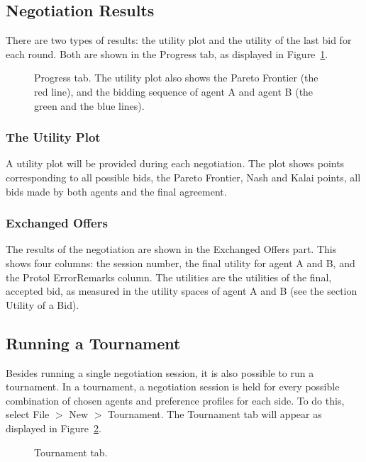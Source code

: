\documentclass[]{article}
\begin{document}
\subsection{Negotiation Results}

There are two types of results: the utility plot and the utility of the last bid for each round. Both are shown in the Progress tab, as displayed in Figure~\ref{Fig:progress}.

\begin{figure}
\caption{Progress tab. The utility plot also shows the Pareto Frontier (the red line), and the bidding sequence of agent A and agent B (the green and the blue lines).}\label{Fig:progress}
\end{figure}

\subsubsection{The Utility Plot}

A utility plot will be provided during each negotiation. The plot shows points corresponding to all possible bids, the Pareto Frontier, Nash and Kalai points, all bids made by both agents and the final agreement.

\subsubsection{Exchanged Offers}

The results of the negotiation are shown in the Exchanged Offers part. This shows four columns: the session number, the final utility for agent A and B, and the Protol ErrorRemarks column. The utilities are the utilities of the final, accepted bid, as measured in the utility spaces of agent A and B (see the section Utility of a Bid).

\subsection{Running a Tournament}

Besides running a single negotiation session, it is also possible to run a tournament. In a tournament, a negotiation session is held for every possible combination of chosen agents and preference profiles for each side. To do this, select File $>$ New $>$ Tournament. The Tournament tab will appear as displayed in Figure~\ref{Fig:tournament}. 
 
\begin{figure}
\caption{Tournament tab.}\label{Fig:tournament}
\end{figure}
\end{document}
